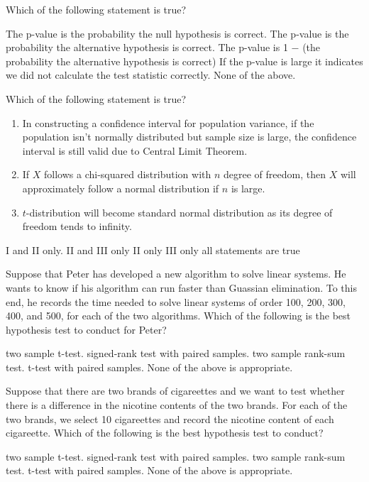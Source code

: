 \documentclass[letterpaper,10pt,addpoints]{exam}
\begin{document}
\begin{questions}
\question Which of the following statement is true?
\begin{choices}
  \choice The p-value is the probability the null hypothesis is correct.
  \choice The p-value is the probability the alternative hypothesis is correct.
  \choice The p-value is 1 $-$ (the probability the alternative hypothesis is correct)
  \choice If the p-value is large it indicates we did not calculate the test statistic correctly.
  \choice [*]None of the above.
\end{choices}

\question Which of the following statement is true?
\begin{enumerate}[I]
  \item In constructing a confidence interval for population variance, if the population isn't normally distributed but sample size is large, the confidence interval is still valid due to Central Limit Theorem.
  \item If $X$ follows a chi-squared distribution with $n$ degree of freedom, then $X$ will approximately follow a normal distribution if $n$ is large.
  \item $t$-distribution will become standard normal distribution as its degree of freedom tends to infinity. 
\end{enumerate}
\begin{choices}
  \choice I and II only.
  \choice [*]II and III only
  \choice II only
  \choice III only
  \choice all statements are true
  \end{choices}


\question Suppose that Peter has developed a new algorithm to solve linear systems. He wants to know if his algorithm can run faster than Guassian elimination. To this end, he records the time needed to solve linear systems of order 100, 200, 300, 400, and 500, for each of the two algorithms. Which of the following is the best hypothesis test to conduct for Peter?
\begin{choices}
  \choice two sample t-test.
  \correctchoice signed-rank test with paired samples.
  \choice two sample rank-sum test.
  \choice t-test with paired samples.
  \choice None of the above is appropriate.
\end{choices}


\question Suppose that there are two brands of cigareettes and we want to test whether there is a difference in the nicotine contents of the two brands. For each of the two brands, we select 10 cigareettes and record the nicotine content of each cigareette. Which of the following is the best hypothesis test to conduct?
\begin{choices}
  \choice two sample t-test.
  \choice signed-rank test with paired samples.
  \correctchoice two sample rank-sum test.
  \choice t-test with paired samples.
  \choice None of the above is appropriate.
\end{choices}


\end{questions}
\end{document}
